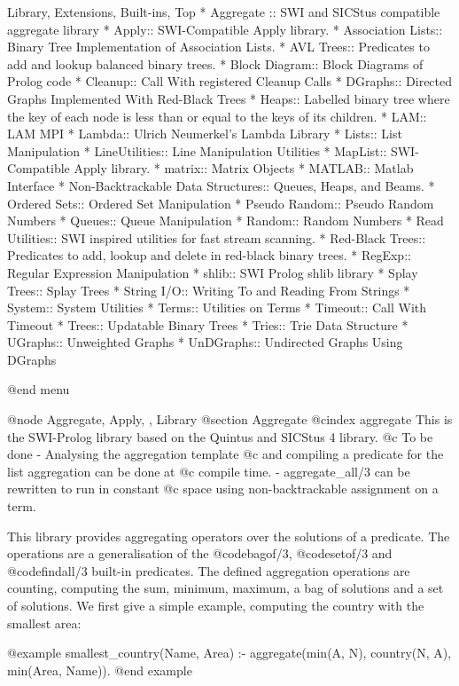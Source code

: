 {{{{{{{{{Library, Extensions, Built-ins, Top
* Aggregate :: SWI and SICStus compatible aggregate library
* Apply:: SWI-Compatible Apply library.
* Association Lists:: Binary Tree Implementation of Association Lists.
* AVL Trees:: Predicates to add and lookup balanced binary  trees.
* Block Diagram:: Block Diagrams of Prolog code
* Cleanup:: Call With registered Cleanup Calls
* DGraphs:: Directed Graphs Implemented With Red-Black Trees
* Heaps:: Labelled binary tree where the key of each node is less
    than or equal to the keys of its children.
* LAM:: LAM MPI
* Lambda:: Ulrich Neumerkel's Lambda Library
* Lists:: List Manipulation
* LineUtilities:: Line Manipulation Utilities
* MapList:: SWI-Compatible Apply library.
* matrix:: Matrix Objects
* MATLAB:: Matlab Interface
* Non-Backtrackable Data Structures:: Queues, Heaps, and Beams.
* Ordered Sets:: Ordered Set Manipulation
* Pseudo Random:: Pseudo Random Numbers
* Queues:: Queue Manipulation
* Random:: Random Numbers
* Read Utilities:: SWI inspired utilities for fast stream scanning.
* Red-Black Trees:: Predicates to add, lookup and delete in red-black binary  trees.
* RegExp:: Regular Expression Manipulation
* shlib:: SWI Prolog shlib library
* Splay Trees:: Splay Trees
* String I/O:: Writing To and Reading From Strings
* System:: System Utilities
* Terms:: Utilities on Terms
* Timeout:: Call With Timeout
* Trees:: Updatable Binary Trees
* Tries:: Trie Data Structure
* UGraphs:: Unweighted Graphs
* UnDGraphs:: Undirected Graphs Using DGraphs


@end menu

 
@node Aggregate, Apply, , Library
@section Aggregate
@cindex aggregate
This is the SWI-Prolog library based on  the Quintus and SICStus 4
library.   @c To be done - Analysing the aggregation template
@c and compiling a predicate for the list aggregation can be done at
@c compile time.  - aggregate_all/3 can be rewritten to run in constant
@c space using non-backtrackable assignment on a term.

This library provides aggregating operators over the solutions of a
predicate. The operations are a generalisation of the @code{bagof/3},
@code{setof/3} and @code{findall/3} built-in predicates. The defined
aggregation operations are counting, computing the sum, minimum,
maximum, a bag of solutions and a set of solutions. We first give a
simple example, computing the country with the smallest area:

@example
smallest_country(Name, Area) :-
        aggregate(min(A, N), country(N, A), min(Area, Name)).
@end example

}}}}}}}}}
